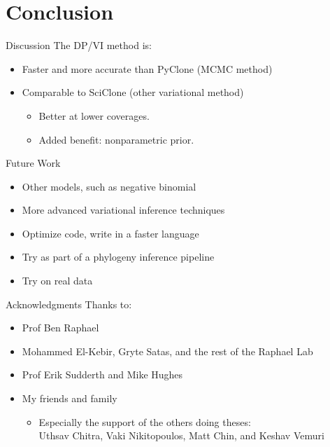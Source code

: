 \documentclass{beamer}
\begin{document}
\section{Conclusion}

\begin{frame}{Discussion}
The DP/VI method is: \vspace{0.1in}
\begin{itemize}
	\setlength\itemsep{1em}
	\item<2-> Faster and more accurate than PyClone (MCMC method)
	\item<3-> Comparable to SciClone (other variational method)
	\begin{itemize}
		\item<4-> Better at lower coverages.
		\item<5-> Added benefit: nonparametric prior.
	\end{itemize}
\end{itemize}
\end{frame}

\begin{frame}{Future Work}
\begin{itemize}
	\setlength\itemsep{0.75em}
	\item<2-> Other models, such as negative binomial
	\item<3-> More advanced variational inference techniques
	\item<4-> Optimize code, write in a faster language
	\item<5-> Try as part of a phylogeny inference pipeline
	\item<6-> Try on real data
\end{itemize}
\end{frame}

\begin{frame}{Acknowledgments}
Thanks to:
\begin{itemize}
	\setlength\itemsep{0.5em}
	\item Prof Ben Raphael
	\item Mohammed El-Kebir, Gryte Satas, and the rest of the Raphael Lab
	\item Prof Erik Sudderth and Mike Hughes
	\item My friends and family
		\begin{itemize}
			\item Especially the support of the others doing theses: \\Uthsav Chitra, Vaki Nikitopoulos, Matt Chin, and Keshav Vemuri
		\end{itemize}
\end{itemize}
\end{frame}
\end{document}
